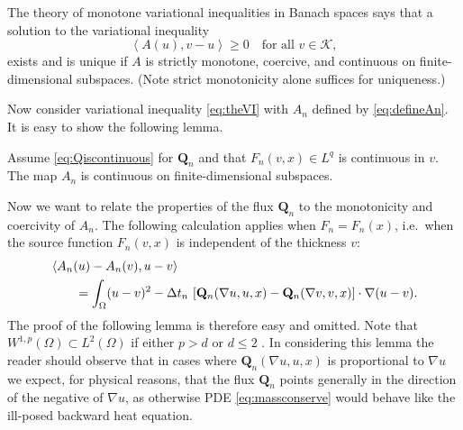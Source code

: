 \documentclass[final,onefignum]{siamart190516}
\newcommand\bQ{\mathbf{Q}}
\newcommand{\grad}{\nabla}
\newcommand{\ip}[2]{\ensuremath{\left<#1,#2\right>}}
\newcommand\RR{\mathbb{R}}
\begin{document}
The theory of monotone variational inequalities in Banach spaces \cite[chapter III]{KinderlehrerStampacchia1980} says that a solution to the variational inequality
\begin{equation}
    \ip{A(u)}{v-u} \ge 0 \quad \text{for all $v\in\mathcal{K}$}, \label{eq:VIabstract}
\end{equation}
exists and is unique if $A$ is strictly monotone, coercive, and continuous on finite-dimensional subspaces.  (Note strict monotonicity alone suffices for uniqueness.)

Now consider variational inequality \eqref{eq:theVI} with $A_n$ defined by \eqref{eq:defineAn}.  It is easy to show the following lemma.

\begin{lemma}  \label{lem:continuous}  Assume \eqref{eq:Qiscontinuous} for $\bQ_n$ and that $F_n(v,x)\in L^q$ is continuous in $v$.  The map $A_n$ is continuous on finite-dimensional subspaces.
\end{lemma}


Now we want to relate the properties of the flux $\bQ_n$ to the monotonicity and coercivity of $A_n$.  The following calculation applies when $F_n=F_n(x)$, i.e.~when the source function $F_n(v,x)$ is independent of the thickness $v$:
\begin{align}
   &\ip{A_n(u) - A_n(v)}{u-v}  \label{eq:AtoQcalculation} \\
   &\qquad = \int_\Omega (u-v)^2 - \Delta t_n\, \left[\bQ_n(\grad u,u,x) - \bQ_n(\grad v,v,x)\right] \cdot \grad(u-v).  \notag
\end{align}
The proof of the following lemma is therefore easy and omitted.  Note that $W^{1,p}(\Omega) \subset L^2(\Omega)$ if either $p>d$ or $d\le 2$ \cite[theorems 5.6.2 and 5.6.5]{Evans2010}.  %
In considering this lemma the reader should observe that in cases where $\bQ_n(\grad u,u,x)$ is proportional to $\grad u$ we expect, for physical reasons, that the flux $\bQ_n$ points generally in the direction of the negative of $\grad u$, as otherwise PDE \eqref{eq:massconserve} would behave like the ill-posed backward heat equation.
\end{document}
